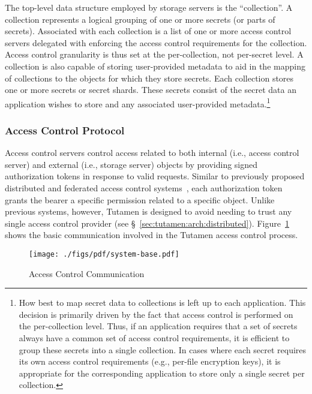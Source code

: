 The top-level data structure employed by storage servers is the
``collection''. A collection represents a logical grouping of one or
more secrets (or parts of secrets). Associated with each collection is
a list of one or more access control servers delegated with enforcing
the access control requirements for the collection. Access control
granularity is thus set at the per-collection, not per-secret level. A
collection is also capable of storing user-provided metadata to aid in
the mapping of collections to the objects for which they store
secrets. Each collection stores one or more secrets or secret
shards. These secrets consist of the secret data an application wishes
to store and any associated user-provided metadata.\footnote{How best
  to map secret data to collections is left up to each
  application. This decision is primarily driven by the fact that
  access control is performed on the per-collection level. Thus, if an
  application requires that a set of secrets always have a common set
  of access control requirements, it is efficient to group these
  secrets into a single collection.  In cases where each secret
  requires its own access control requirements (e.g., per-file
  encryption keys), it is appropriate for the corresponding
  application to store only a single secret per collection.}

\subsubsection{Access Control Protocol}
\label{sec:tutamen:arch:acp}

Access control servers control access related to both internal (i.e.,
access control server) and external (i.e., storage server) objects by
providing signed authorization tokens in response to valid
requests. Similar to previously proposed distributed and federated
access control systems~\cite{neuman1994, calero2010, leandro2012},
each authorization token grants the bearer a specific permission
related to a specific object. Unlike previous systems, however,
Tutamen is designed to avoid needing to trust any single access
control provider (see \S~\ref{sec:tutamen:arch:distributed}).
Figure~\ref{fig:tutamen:systembase} shows the basic communication
involved in the Tutamen access control process.

\begin{figure}[th]
  \centering
  \texttt{[image: ./figs/pdf/system-base.pdf]}
  \caption{Access Control Communication}
  \label{fig:tutamen:systembase}
\end{figure}

